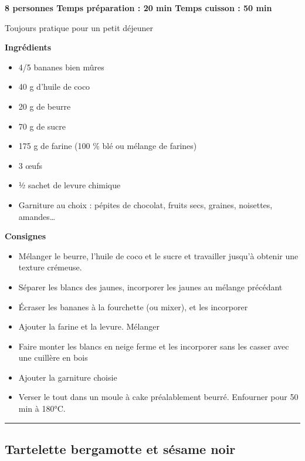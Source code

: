 \documentclass[]{book}
\providecommand{\tightlist}{%
  \setlength{\itemsep}{0pt}\setlength{\parskip}{0pt}}
\begin{document}
\begin{sucrebox}
\textbf{8 personnes \textbar{} Temps préparation : 20 min \textbar{}
Temps cuisson : 50 min}

Toujours pratique pour un petit déjeuner
\end{sucrebox}

\textbf{Ingrédients}

\begin{itemize}
\tightlist
\item
  4/5 bananes bien mûres
\item
  40 g d'huile de coco
\item
  20 g de beurre
\item
  70 g de sucre
\item
  175 g de farine (100 \% blé ou mélange de farines)
\item
  3 œufs
\item
  ½ sachet de levure chimique
\item
  Garniture au choix : pépites de chocolat, fruits secs, graines, noisettes, amandes\ldots{}
\end{itemize}

\textbf{Consignes}

\begin{itemize}
\tightlist
\item
  Mélanger le beurre, l'huile de coco et le sucre et travailler jusqu'à obtenir une texture crémeuse.
\item
  Séparer les blancs des jaunes, incorporer les jaunes au mélange précédant
\item
  Écraser les bananes à la fourchette (ou mixer), et les incorporer
\item
  Ajouter la farine et la levure. Mélanger
\item
  Faire monter les blancs en neige ferme et les incorporer sans les casser avec une cuillère en bois
\item
  Ajouter la garniture choisie
\item
  Verser le tout dans un moule à cake préalablement beurré. Enfourner pour 50 min à 180°C.
\end{itemize}

\begin{center}\rule{0.5\linewidth}{0.5pt}\end{center}

\hypertarget{tartelette-bergamotte-et-suxe9same-noir}{%
\subsection*{\texorpdfstring{{Tartelette bergamotte et sésame noir}}{Tartelette bergamotte et sésame noir}}\label{tartelette-bergamotte-et-suxe9same-noir}}
\end{document}

